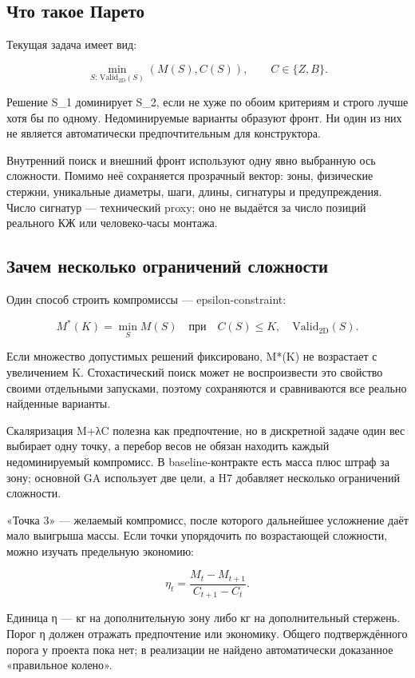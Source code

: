 \documentclass[11pt,a4paper]{article}
\begin{document}
\subsection{Что такое Парето}

Текущая задача имеет вид:


\[
\min_{S:\,\mathrm{Valid}_{\mathrm{2D}}(S)}(M(S),C(S)),
\qquad C\in\{Z,B\}.
\]

Решение S\_1 доминирует S\_2, если не хуже по обоим критериям и строго лучше хотя бы по одному. Недоминируемые варианты образуют фронт. Ни один из них не является автоматически предпочтительным для конструктора.


Внутренний поиск и внешний фронт используют одну явно выбранную ось сложности. Помимо неё сохраняется прозрачный вектор: зоны, физические стержни, уникальные диаметры, шаги, длины, сигнатуры и предупреждения. Число сигнатур — технический proxy; оно не выдаётся за число позиций реального КЖ или человеко-часы монтажа.


\subsection{Зачем несколько ограничений сложности}

Один способ строить компромиссы — epsilon-constraint:


\[
M^*(K)=\min_S M(S)\quad\text{при}\quad C(S)\le K,
\quad\mathrm{Valid}_{\mathrm{2D}}(S).
\]

Если множество допустимых решений фиксировано, M*(K) не возрастает с увеличением K. Стохастический поиск может не воспроизвести это свойство своими отдельными запусками, поэтому сохраняются и сравниваются все реально найденные варианты.


Скаляризация M+λC полезна как предпочтение, но в дискретной задаче один вес выбирает одну точку, а перебор весов не обязан находить каждый недоминируемый компромисс. В baseline-контракте есть масса плюс штраф за зону; основной GA использует две цели, а H7 добавляет несколько ограничений сложности.


«Точка 3» — желаемый компромисс, после которого дальнейшее усложнение даёт мало выигрыша массы. Если точки упорядочить по возрастающей сложности, можно изучать предельную экономию:


\[
\eta_t=\frac{M_t-M_{t+1}}{C_{t+1}-C_t}.
\]

Единица η — кг на дополнительную зону либо кг на дополнительный стержень. Порог η должен отражать предпочтение или экономику. Общего подтверждённого порога у проекта пока нет; в реализации не найдено автоматически доказанное «правильное колено».
\end{document}
